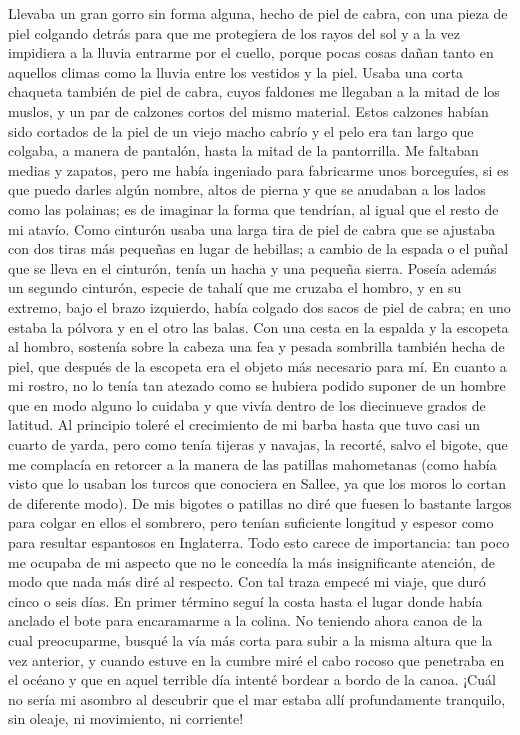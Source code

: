 \documentclass{novela}
\begin{document}
    Llevaba un gran gorro sin forma alguna, hecho de piel de cabra, con una pieza de piel colgando detrás para que me protegiera de los rayos del sol y a la vez impidiera a la lluvia entrarme por el cuello, porque pocas cosas dañan tanto en aquellos climas como la lluvia entre los vestidos y la piel.
    Usaba una corta chaqueta también de piel de cabra, cuyos faldones me llegaban a la mitad de los muslos, y un par de calzones cortos del mismo material. Estos calzones habían sido cortados de la piel de un viejo macho cabrío y el pelo era tan largo que colgaba, a manera de pantalón, hasta la mitad de la pantorrilla. Me faltaban medias y zapatos, pero me había ingeniado para fabricarme unos borceguíes, si es que puedo darles algún nombre, altos de pierna y que se anudaban a los lados como las polainas; es de imaginar la forma que tendrían, al igual que el resto de mi atavío.
    Como cinturón usaba una larga tira de piel de cabra que se ajustaba con dos tiras más pequeñas en lugar de hebillas; a cambio de la espada o el puñal que se lleva en el cinturón, tenía un hacha y una pequeña sierra. Poseía además un segundo cinturón, especie de tahalí que me cruzaba el hombro, y en su extremo, bajo el brazo izquierdo, había colgado dos sacos de piel de cabra; en uno estaba la pólvora y en el otro las balas. Con una cesta en la espalda y la escopeta al hombro, sostenía sobre la cabeza una fea y pesada sombrilla también hecha de piel, que después de la escopeta era el objeto más necesario para mí. En cuanto a mi rostro, no lo tenía tan atezado como se hubiera podido suponer de un hombre que en modo alguno lo cuidaba y que vivía dentro de los diecinueve grados de latitud. Al principio toleré el crecimiento de mi barba hasta que tuvo casi un cuarto de yarda, pero como tenía tijeras y navajas, la recorté, salvo el bigote, que me complacía en retorcer a la manera de las patillas mahometanas (como había visto que lo usaban los turcos que conociera en Sallee, ya que los moros lo cortan de diferente modo).
    De mis bigotes o patillas no diré que fuesen lo bastante largos para colgar en ellos el sombrero, pero tenían suficiente longitud y espesor como para resultar espantosos en Inglaterra.
    Todo esto carece de importancia: tan poco me ocupaba de mi aspecto que no le concedía la más insignificante atención, de modo que nada más diré al respecto. Con tal traza empecé mi viaje, que duró cinco o seis días. En primer término seguí la costa hasta el lugar donde había anclado el bote para encaramarme a la colina. No teniendo ahora canoa de la cual preocuparme, busqué la vía más corta para subir a la misma altura que la vez anterior, y cuando estuve en la cumbre miré el cabo rocoso que penetraba en el océano y que en aquel terrible día intenté bordear a bordo de la canoa. ¡Cuál no sería mi asombro al descubrir que el mar estaba allí profundamente tranquilo, sin oleaje, ni movimiento, ni corriente!
\end{document}
